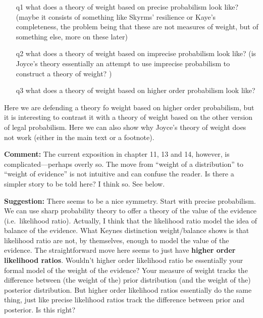 \documentclass[
  10pt,
  dvipsnames,enabledeprecatedfontcommands]{scrartcl}
\begin{document}
\begin{itemize}

\item[q1] what does a theory of weight based on precise probabilism look like? (maybe it consists of something like Skyrms' resilience or Kaye's completeness, the problem being that these are not measures of weight, but of something else, more on these later)

\item[q2] what does a theory of weight based on imprecise probabilism look like? (is Joyce's theory essentially an attempt to use imprecise probabilism to construct a theory of weight? )

\item[q3] what does a theory of weight based on higher order probabilism look like?

\end{itemize}

Here we are defending a theory fo weight based on higher order
probabilism, but it is interesting to contrast it with a theory of
weight based on the other version of legal probabilism. Here we can also
show why Joyce's theory of weight does not work (either in the main text
or a footnote).

\textbf{Comment:} The current exposition in chapter 11, 13 and 14,
however, is complicated---perhaps overly so. The move from ``weight of a
distribution'' to ``weight of evidence'' is not intuitive and can
confuse the reader. Is there a simpler story to be told here? I think
so. See below.

\textbf{Suggestion:} There seems to be a nice symmetry. Start with
precise probabilism. We can use sharp probability theory to offer a
theory of the value of the evidence (i.e.~likelihood ratio). Actually, I
think that the likelihood ratio model the idea of balance of the
evidence. What Keynes distinction weight/balance shows is that
likelihood ratio are not, by themselves, enough to model the value of
the evidence. The straightforward move here seems to just have
\textbf{higher order likelihood ratios}. Wouldn't higher order
likelihood ratio be essentially your formal model of the weight of the
evidence? Your measure of weight tracks the difference between (the
weight of the) prior distribution (and the weight of the) posterior
distribution. But higher order likelihood ratios essentially do the same
thing, just like precise likelihood ratios track the difference between
prior and posterior. Is this right? 
\end{document}
